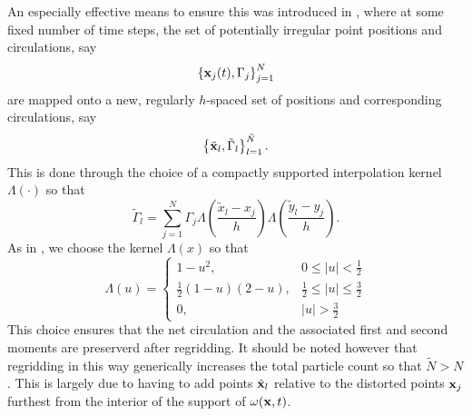 \documentclass[a4paper,11pt]{article}
\begin{document}
An especially effective means to ensure this was introduced in \cite{koumoutsakos}, where at some fixed number of time steps, the set of potentially irregular point positions and circulations, say 
\[ 
\left\{{\bf x}_{j}(t), \Gamma_{j} \right\}_{j=1}^{N}
\]
are mapped onto a new, regularly $h$-spaced set of positions and corresponding circulations, say  
\[
\left\{\tilde{{\bf x}}_{l}, \tilde{\Gamma}_{l} \right\}_{l=1}^{\tilde{N}}.
\]
This is done through the choice of a compactly supported interpolation kernel $\Lambda(\cdot)$ so that 
\[
\tilde{\Gamma}_{l} = \sum_{j=1}^{N} \Gamma_{j}\Lambda\left(\frac{\tilde{x}_{l}-x_{j}}{h} \right)\Lambda\left(\frac{\tilde{y}_{l}-y_{j}}{h} \right).
\]
As in \cite{koumoutsakos}, we choose the kernel $\Lambda(x)$ so that 
\[
\Lambda(u) = \left\{
\begin{array}{rl} 
1 - u^{2}, & 0\leq |u| < \frac{1}{2}\\
\frac{1}{2}(1-u)(2-u), & \frac{1}{2}\leq |u|\leq \frac{3}{2}\\
0, & |u| > \frac{3}{2}
\end{array}
\right.
\]
This choice ensures that the net circulation and the associated first and second moments are preserverd after regridding.  It should be noted however that regridding in this way generically increases the total particle count so that $\tilde{N}>N$.  This is largely due to having to add points $\tilde{{\bf x}}_{l}$ relative to the distorted points ${\bf x}_{j}$ furthest from the interior of the support of $\omega({\bf x},t)$.   
\end{document}
